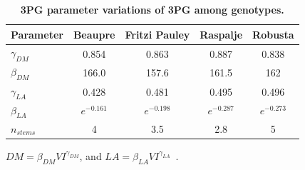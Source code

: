 \documentclass[10pt]{article}
\newcommand{\sps}{\ensuremath{n_{stems}}}
\newcommand{\cancover}{\ensuremath{CanCover}}
\begin{document}
\begin{table}%
  \centering
  \caption{ { \bf 3PG parameter variations of 3PG among genotypes.}}
  \begin{tabular}{|l|c|c|c|c|}
    \hline
    Parameter & Beaupre & Fritzi Pauley & Raspalje & Robusta \\
    \hline
    $\gamma_{DM}$ &  0.854 & 0.863 & 0.887 & 0.838 \\
    $\beta_{DM}$  & 166.0 & 157.6 & 161.5 & 162  \\
    $\gamma_{LA}$ &  0.428 &  0.481 & 0.495 & 0.496 \\ 
    $\beta_{LA}$ & $e^{-0.161}$ & $e^{-0.198}$ & $e^{-0.287}$ & $e^{-0.273}$ \\
    \sps & 4 & 3.5 & 2.8 & 5 \\
    \hline 
  \end{tabular}
  \begin{flushleft}$DM=\beta_{DM} VI^{\gamma_{DM}}$, and $LA = \beta_{LA} VI^{\gamma_{LA}}$~\cite{pontailler97-volume-index,Pontailler1999,Ceulemans1993}.
\end{flushleft}  
\label{tab:pont-3pg}
\end{table}
\fi
\end{document}
